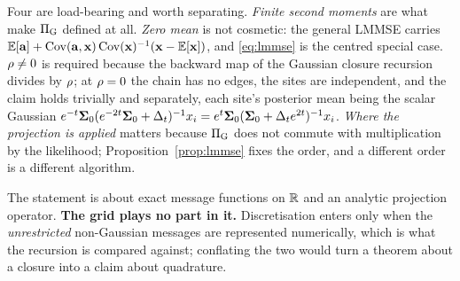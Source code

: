 
\begin{remark}
\label{rem:lmmse-hyp}
Four are load-bearing and worth separating. \emph{Finite second moments} are what make $\Pi_{\mathrm{G}}$
defined at all. \emph{Zero mean} is not cosmetic: the general LMMSE carries
$\mathbb{E}[\mathbf{a}] + \operatorname{Cov}(\mathbf{a},\mathbf{x})\operatorname{Cov}(\mathbf{x})^{-1}(\mathbf{x}-\mathbb{E}[\mathbf{x}])$, and \eqref{eq:lmmse} is the centred
special case. \emph{$\rho\neq0$} is required because the backward map of the Gaussian closure
recursion divides by $\rho$; at $\rho=0$ the chain has no edges, the sites are independent, and the
claim holds trivially and separately, each site's posterior mean being the scalar Gaussian
$e^{-t}\mathbf{\Sigma}_0(e^{-2t}\mathbf{\Sigma}_0+\Delta_t)^{-1}x_i = e^{t}\mathbf{\Sigma}_0(\mathbf{\Sigma}_0+\Delta_t e^{2t})^{-1}x_i$. \emph{Where the projection is applied} matters because
$\Pi_{\mathrm{G}}$ does not commute with multiplication by the likelihood; Proposition~\ref{prop:lmmse}
fixes the order, and a different order is a different algorithm.

The statement is about exact message functions on $\mathbb{R}$ and an analytic projection operator.
\textbf{The grid plays no part in it.} Discretisation enters only when the \emph{unrestricted}
non-Gaussian messages are represented numerically, which is what the recursion is compared
against; conflating the two would turn a theorem about a closure into a claim about quadrature.
\end{remark}

